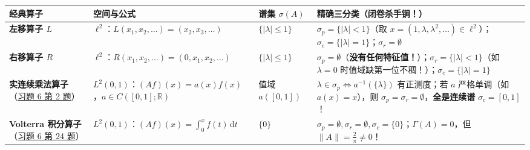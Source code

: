 \documentclass[11pt,a4paper]{article}
\newcounter{none}
\begin{document}
{\def\LTcaptype{none} %
{\small\renewcommand{\arraystretch}{1.38}\setlength{\tabcolsep}{5pt}
\begin{longtable}[]{@{}
  >{\raggedright\arraybackslash}p{}
  >{\raggedright\arraybackslash}p{}
  >{\raggedright\arraybackslash}p{}
  >{\raggedright\arraybackslash}p{}@{}}
\toprule\noalign{}
\rowcolor{AccentSoft}
\begin{minipage}[b]{\linewidth}\raggedright
经典算子
\end{minipage} & \begin{minipage}[b]{\linewidth}\raggedright
空间与公式
\end{minipage} & \begin{minipage}[b]{\linewidth}\raggedright
谱集 \(\sigma(A)\)
\end{minipage} & \begin{minipage}[b]{\linewidth}\raggedright
精确三分类（闭卷杀手锏！）
\end{minipage} \\
\midrule\noalign{}
\endhead
\bottomrule\noalign{}
\endlastfoot
\textbf{左移算子 \(L\)} & \(\ell^2\)：\(L(x_1, x_2, \dots) = (x_2, x_3, \dots)\) & \(\{\lvert\lambda\rvert \le 1\}\) & \(\sigma_p = \{\lvert\lambda\rvert < 1\}\)（取 \(x=(1,\lambda,\lambda^2,\dots)\in\ell^2\)）；\(\sigma_c = \{\lvert\lambda\rvert = 1\}\)；\(\sigma_r = \emptyset\) \\
\textbf{右移算子 \(R\)} & \(\ell^2\)：\(R(x_1, x_2, \dots) = (0, x_1, x_2, \dots)\) & \(\{\lvert\lambda\rvert \le 1\}\) & \(\sigma_p = \emptyset\)（\textbf{没有任何特征值！}）；\(\sigma_r = \{\lvert\lambda\rvert < 1\}\)（如 \(\lambda=0\) 时值域缺第一位不稠！）；\(\sigma_c = \{\lvert\lambda\rvert = 1\}\) \\
\textbf{实连续乘法算子}（\hyperlink{prob:6-2}{\textcolor{LinkColor}{习题 6 第 2 题}}） & \(L^2(0,1)\)：\((Af)(x) = a(x)f(x)\)，\(a \in C([0,1];\mathbb{R})\) & 值域 \(a([0,1])\) & \(\lambda \in \sigma_p \iff a^{-1}(\{\lambda\})\) 有正测度；若 \(a\) 严格单调（如 \(a(x)=x\)），则 \(\sigma_p = \sigma_r = \emptyset\)，\textbf{全是连续谱} \(\sigma_c = [0,1]\)！ \\
\textbf{Volterra 积分算子}（\hyperlink{prob:6-24}{\textcolor{LinkColor}{习题 6 第 24 题}}） & \(L^2(0,1)\)：\((Af)(x) = \int_0^x f(t)\,\mathrm{d}t\) & \(\{0\}\) & \(\sigma_p = \emptyset, \sigma_r = \emptyset, \sigma_c = \{0\}\)；\(\Gamma(A) = 0\)，但 \(\lVert A\rVert = \frac{2}{\pi} \neq 0\)！ \\
\end{longtable}
}
}
\end{document}
